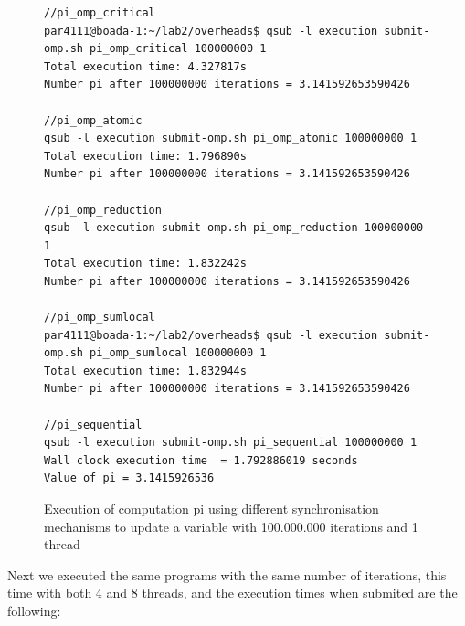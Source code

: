 \documentclass[12]{article}
\begin{document}
\begin{figure}[H]
\begin{lstlisting}[frame=single]
//pi_omp_critical
par4111@boada-1:~/lab2/overheads$ qsub -l execution submit-omp.sh pi_omp_critical 100000000 1
Total execution time: 4.327817s
Number pi after 100000000 iterations = 3.141592653590426

//pi_omp_atomic
qsub -l execution submit-omp.sh pi_omp_atomic 100000000 1
Total execution time: 1.796890s
Number pi after 100000000 iterations = 3.141592653590426

//pi_omp_reduction
qsub -l execution submit-omp.sh pi_omp_reduction 100000000 1
Total execution time: 1.832242s
Number pi after 100000000 iterations = 3.141592653590426

//pi_omp_sumlocal
par4111@boada-1:~/lab2/overheads$ qsub -l execution submit-omp.sh pi_omp_sumlocal 100000000 1
Total execution time: 1.832944s
Number pi after 100000000 iterations = 3.141592653590426

//pi_sequential
qsub -l execution submit-omp.sh pi_sequential 100000000 1
Wall clock execution time  = 1.792886019 seconds
Value of pi = 3.1415926536

\end{lstlisting}
\caption{Execution of computation pi using different synchronisation mechanisms to update a variable with 100.000.000 iterations and 1 thread}
\label{overheadsComputation}
\end{figure}


Next we executed the same programs with the same number of iterations, this time with both 4 and 8 threads, and the execution times when submited are the following:
\end{document}
